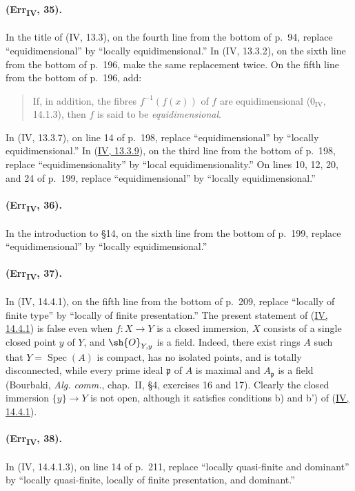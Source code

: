 {\paragraph{(Err\textsubscript{IV}, 35).}
In the title of (IV, 13.3), on the fourth line from the bottom of p.~94,
replace ``equidimensional'' by ``locally equidimensional.''  In
(IV, 13.3.2), on the sixth line from the bottom of p.~196, make the same
replacement twice.  On the fifth line from the bottom of p.~196, add:
\begin{quote}
If, in addition, the fibres $f^{-1}(f(x))$ of $f$ are equidimensional
($0_{\mathrm{IV}}$, 14.1.3), then $f$ is said to be
\emph{equidimensional}.
\end{quote}
In (IV, 13.3.7), on line 14 of p.~198, replace ``equidimensional'' by
``locally equidimensional.''  In ({\hyperlink{ega4.c04.statement.13-3-9}{IV, 13.3.9}}), on the third line from
the bottom of p.~198, replace ``equidimensionality'' by ``local
equidimensionality.''  On lines 10, 12, 20, and 24 of p.~199, replace
``equidimensional'' by ``locally equidimensional.''

\paragraph{(Err\textsubscript{IV}, 36).}
In the introduction to \S14, on the sixth line from the bottom of
p.~199, replace ``equidimensional'' by ``locally equidimensional.''

\paragraph{(Err\textsubscript{IV}, 37).}
In (IV, 14.4.1), on the fifth line from the bottom of p.~209, replace
``locally of finite type'' by ``locally of finite presentation.''  The
present statement of ({\hyperlink{ega4.c04.thm.14-4-1}{IV, 14.4.1}}) is false even when $f:X\to Y$ is a
closed immersion, $X$ consists of a single closed point $y$ of $Y$, and
$\sh{O}_{Y,y}$ is a field.  Indeed, there exist rings $A$ such that
$Y=\operatorname{Spec}(A)$ is compact, has no isolated points, and is
totally disconnected, while every prime ideal $\mathfrak p$ of $A$ is
maximal and $A_\mathfrak p$ is a field (Bourbaki,
\emph{Alg. comm.}, chap.~II, \S4, exercises 16 and 17).  Clearly the
closed immersion $\{y\}\to Y$ is not open, although it satisfies
conditions b) and b') of ({\hyperlink{ega4.c04.thm.14-4-1}{IV, 14.4.1}}).

\paragraph{(Err\textsubscript{IV}, 38).}
In (IV, 14.4.1.3), on line 14 of p.~211, replace ``locally quasi-finite
and dominant'' by ``locally quasi-finite, locally of finite presentation,
and dominant.''

}
